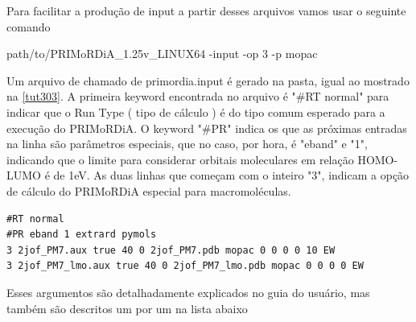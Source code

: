 \documentclass[a4paper,11pt]{refart}
\begin{document}
Para facilitar a produção de input a partir desses arquivos vamos usar o seguinte comando


\hspace*{-1.2\leftmarginwidth}
\begin{minipage}{\fullwidth}
\begin{commandshell}path/to/PRIMoRDiA_1.25v_LINUX64 -input -op 3 -p mopac\end{commandshell}
\end{minipage}


Um arquivo de chamado de primordia.input é gerado na pasta, igual ao mostrado na \autoref{tut303}. A primeira keyword encontrada no arquivo é "\#RT normal" para indicar que o Run Type ( tipo de cálculo ) é do tipo comum esperado para a execução do PRIMoRDiA. O keyword "\#PR" indica os que as próximas entradas na linha são parâmetros especiais, que no caso, por hora, é "eband" e "1", indicando que o limite para considerar orbitais moleculares em relação HOMO-LUMO é de 1eV. As duas linhas que começam com o inteiro "3", indicam a opção de cálculo do PRIMoRDiA especial para macromoléculas. 

\hspace*{-1\leftmarginwidth}
\begin{minipage}{\fullwidth}
\begin{lstlisting}[caption={Input editado para execução do tutorial 3},label={tut301}]
#RT normal 
#PR eband 1 extrard pymols 
3 2jof_PM7.aux true 40 0 2jof_PM7.pdb mopac 0 0 0 0 10 EW 
3 2jof_PM7_lmo.aux true 40 0 2jof_PM7_lmo.pdb mopac 0 0 0 0 EW	
\end{lstlisting}
\end{minipage}

Esses argumentos são detalhadamente explicados no guia do usuário, mas também são descritos um por um na lista abaixo
\end{document}
